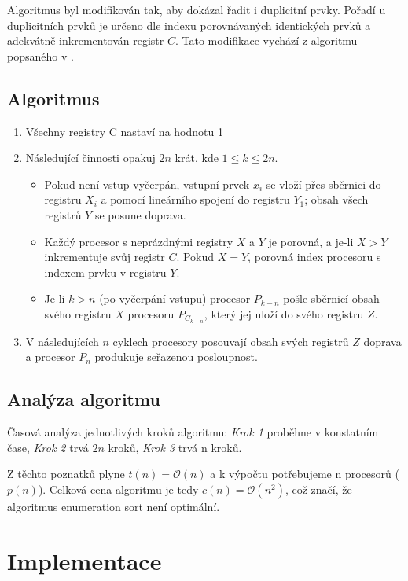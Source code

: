\documentclass[11pt,a4paper]{article}
\begin{document}
Algoritmus byl modifikován tak, aby dokázal řadit i duplicitní prvky. Pořadí u duplicitních prvků je určeno dle indexu porovnávaných identických prvků a adekvátně inkrementován registr $C$. Tato modifikace vychází z algoritmu popsaného v \cite{bib:sushi}.

\subsection{Algoritmus}
\begin{enumerate}
    \item {Všechny registry C nastaví na hodnotu 1}
    \item {Následující činnosti opakuj $2n$ krát, kde $1 \leq k \leq 2n$.}
        \begin{itemize}
            \item{Pokud není vstup vyčerpán, vstupní prvek $x_i$ se vloží přes sběrnici do registru $X_i$ a pomocí lineárního spojení do registru $Y_1$; obsah všech registrů $Y$ se posune doprava.}
            \item{Každý procesor s neprázdnými registry $X$ a $Y$ je porovná, a je-li $X > Y$ inkrementuje svůj registr $C$. Pokud $X = Y$, porovná index procesoru s indexem prvku v registru $Y$.}
			\item{Je-li $k > n$ (po vyčerpání vstupu) procesor $P_{k-n}$ pošle sběrnicí obsah svého registru $X$ procesoru $P_{C_{k-n}}$, který jej uloží do svého registru $Z$.}
        \end{itemize}
	\item{V následujících $n$ cyklech procesory posouvají obsah svých registrů $Z$ doprava a procesor $P_n$ produkuje seřazenou posloupnost.}
\end{enumerate}

\subsection{Analýza algoritmu}
Časová analýza jednotlivých kroků algoritmu: \textit{Krok 1} proběhne v konstatním čase, \textit{Krok 2} trvá $2n$ kroků, \textit{Krok 3} trvá n kroků.

Z těchto poznatků plyne $t(n) = \mathcal{O}(n)$ a k výpočtu potřebujeme n procesorů ($p(n)$). Celková cena algoritmu je tedy $c(n) = \mathcal{O}(n^2)$, což značí, že algoritmus enumeration sort není optimální.

\section{Implementace}
\end{document}
